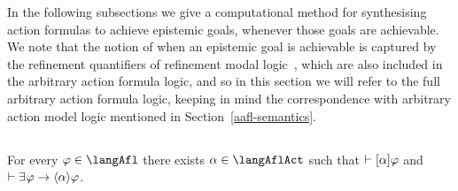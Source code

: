 In the following subsections we give a computational method for synthesising action formulas to achieve epistemic goals, whenever those goals are achievable.
We note that the notion of when an epistemic goal is achievable is captured by the refinement quantifiers of refinement modal logic~\cite{vanditmarsch:2009,bozzelli:2014b}, which are also included in the arbitrary action formula logic, and so in this section we will refer to the full arbitrary action formula logic, keeping in mind the correspondence with arbitrary action model logic mentioned in Section~\ref{aafl-semantics}.

\subsection{\classK{}}

\begin{proposition}\label{afl-k-synthesis}
For every $\phi \in \langAfl$ there exists $\alpha \in \langAflAct$ such that $\vdash {[ {\alpha} ]} \varphi$ and $\proves \somerefs \phi \implies \actionE{\alpha} \phi$.
\end{proposition}

